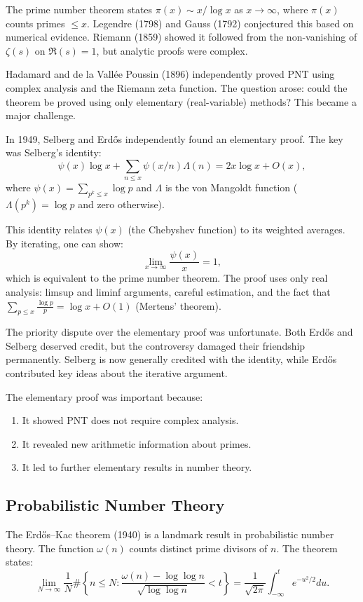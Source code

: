 The prime number theorem states $\pi(x) \sim x/\log x$ as $x \to \infty$, where $\pi(x)$ counts primes $\leq x$. Legendre (1798) and Gauss (1792) conjectured this based on numerical evidence. Riemann (1859) showed it followed from the non-vanishing of $\zeta(s)$ on $\Re(s) = 1$, but analytic proofs were complex.

Hadamard and de la Vall\'{e}e Poussin (1896) independently proved PNT using complex analysis and the Riemann zeta function. The question arose: could the theorem be proved using only elementary (real-variable) methods? This became a major challenge.

In 1949, Selberg and Erd\H{o}s independently found an elementary proof. The key was Selberg's identity:
\[
\psi(x) \log x + \sum_{n \leq x} \psi(x/n) \Lambda(n) = 2x \log x + O(x),
\]
where $\psi(x) = \sum_{p^k \leq x} \log p$ and $\Lambda$ is the von Mangoldt function ($\Lambda(p^k) = \log p$ and zero otherwise).

This identity relates $\psi(x)$ (the Chebyshev function) to its weighted averages. By iterating, one can show:
\[
\lim_{x \to \infty} \frac{\psi(x)}{x} = 1,
\]
which is equivalent to the prime number theorem. The proof uses only real analysis: limsup and liminf arguments, careful estimation, and the fact that $\sum_{p \leq x} \frac{\log p}{p} = \log x + O(1)$ (Mertens' theorem).

The priority dispute over the elementary proof was unfortunate. Both Erd\H{o}s and Selberg deserved credit, but the controversy damaged their friendship permanently. Selberg is now generally credited with the identity, while Erd\H{o}s contributed key ideas about the iterative argument.

The elementary proof was important because:
\begin{enumerate}
    \item It showed PNT does not require complex analysis.
    \item It revealed new arithmetic information about primes.
    \item It led to further elementary results in number theory.
\end{enumerate}

\subsection{Probabilistic Number Theory}

The Erd\H{o}s--Kac theorem (1940) is a landmark result in probabilistic number theory. The function $\omega(n)$ counts distinct prime divisors of $n$. The theorem states:
\[
\lim_{N \to \infty} \frac{1}{N} \#\left\{ n \leq N : \frac{\omega(n) - \log\log n}{\sqrt{\log\log n}} < t \right\} = \frac{1}{\sqrt{2\pi}} \int_{-\infty}^t e^{-u^2/2} du.
\]

